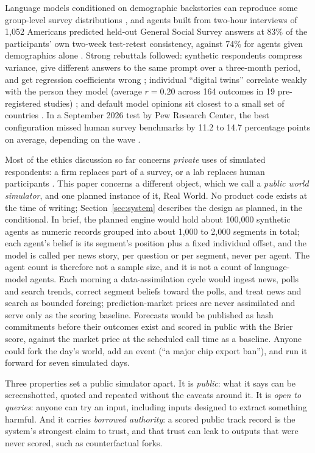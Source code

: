 \documentclass[11pt]{article}
\begin{document}
Language models conditioned on demographic backstories can reproduce some group-level survey distributions \citep{argyle2023outofone}, and agents built from two-hour interviews of 1,052 Americans predicted held-out General Social Survey answers at 83\% of the participants' own two-week test-retest consistency, against 74\% for agents given demographics alone \citep{park2024selfreports}. Strong rebuttals followed: synthetic respondents compress variance, give different answers to the same prompt over a three-month period, and get regression coefficients wrong \citep{bisbee2024synthetic}; individual ``digital twins'' correlate weakly with the person they model (average $r=0.20$ across 164 outcomes in 19 pre-registered studies) \citep{peng2025funhouse}; and default model opinions sit closest to a small set of countries \citep{durmus2023global,tao2023cultural}. In a September 2026 test by Pew Research Center, the best configuration missed human survey benchmarks by 11.2 to 14.7 percentage points on average, depending on the wave \citep{pew2026silicon,pew2026report}.

Most of the ethics discussion so far concerns \emph{private} uses of simulated respondents: a firm replaces part of a survey, or a lab replaces human participants \citep{agnew2024illusion,wang2024misportray}. This paper concerns a different object, which we call a \emph{public world simulator}, and one planned instance of it, Real World. No product code exists at the time of writing; Section~\ref{sec:system} describes the design as planned, in the conditional. In brief, the planned engine would hold about 100,000 synthetic agents as numeric records grouped into about 1,000 to 2,000 segments in total; each agent's belief is its segment's position plus a fixed individual offset, and the model is called per news story, per question or per segment, never per agent. The agent count is therefore not a sample size, and it is not a count of language-model agents. Each morning a data-assimilation cycle would ingest news, polls and search trends, correct segment beliefs toward the polls, and treat news and search as bounded forcing; prediction-market prices are never assimilated and serve only as the scoring baseline. Forecasts would be published as hash commitments before their outcomes exist and scored in public with the Brier score, against the market price at the scheduled call time as a baseline. Anyone could fork the day's world, add an event (``a major chip export ban''), and run it forward for seven simulated days.

Three properties set a public simulator apart. It is \emph{public}: what it says can be screenshotted, quoted and repeated without the caveats around it. It is \emph{open to queries}: anyone can try an input, including inputs designed to extract something harmful. And it carries \emph{borrowed authority}: a scored public track record is the system's strongest claim to trust, and that trust can leak to outputs that were never scored, such as counterfactual forks.
\end{document}
